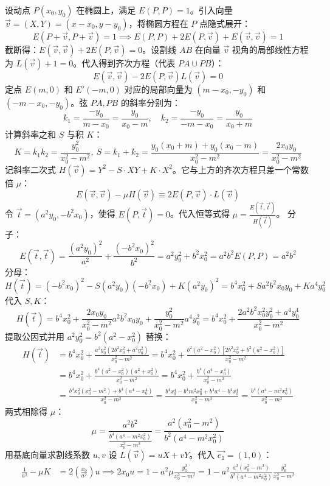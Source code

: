 \begin{solution}
设动点 $P(x_0, y_0)$ 在椭圆上，满足 $E(P,P) = 1$。引入向量 $\vec{v} = (X, Y) = (x-x_0, y-y_0)$，将椭圆方程在 $P$ 点隐式展开：
$$E(P+\vec{v}, P+\vec{v}) = 1 \implies E(P,P) + 2E(P, \vec{v}) + E(\vec{v}, \vec{v}) = 1$$
截断得：$E(\vec{v}, \vec{v}) + 2E(P, \vec{v}) = 0$。设割线 $AB$ 在向量 $\vec{v}$ 视角的局部线性方程为 $L(\vec{v}) + 1 = 0$。代入得到齐次方程（代表 $PA \cup PB$）：
$$E(\vec{v}, \vec{v}) - 2E(P, \vec{v})L(\vec{v}) = 0$$
定点 $E(m,0)$ 和 $E'(-m,0)$ 对应的局部向量为 $(m-x_0, -y_0)$ 和 $(-m-x_0, -y_0)$。弦 $PA, PB$ 的斜率分别为：$$k_1 = \frac{-y_0}{m-x_0} = \frac{y_0}{x_0-m}, \quad k_2 = \frac{-y_0}{-m-x_0} = \frac{y_0}{x_0+m}$$
计算斜率之和 $S$ 与积 $K$：
$$K = k_1 k_2 = \frac{y_0^2}{x_0^2-m^2},~S = k_1 + k_2 = \frac{y_0(x_0+m) + y_0(x_0-m)}{x_0^2-m^2} = \frac{2x_0 y_0}{x_0^2-m^2}$$
记斜率二次式 $H(\vec{v}) = Y^2 - S \cdot XY + K \cdot X^2$。它与上方的齐次方程只差一个常数倍 $\mu$：$$E(\vec{v}, \vec{v}) - \mu H(\vec{v}) \equiv 2E(P, \vec{v}) \cdot L(\vec{v})$$
令 $\vec{t} = (a^2 y_0, -b^2 x_0)$，使得 $E(P, \vec{t}) = 0$。代入恒等式得 $\mu = \frac{E(\vec{t}, \vec{t})}{H(\vec{t})}$。
分子：
$$E(\vec{t}, \vec{t}) = \frac{(a^2 y_0)^2}{a^2} + \frac{(-b^2 x_0)^2}{b^2} = a^2 y_0^2 + b^2 x_0^2 = a^2 b^2 E(P,P) = a^2 b^2$$
分母：$$H(\vec{t}) = (-b^2 x_0)^2 - S(a^2 y_0)(-b^2 x_0) + K(a^2 y_0)^2= b^4 x_0^2 + S a^2 b^2 x_0 y_0 + K a^4 y_0^2$$
代入 $S, K$：
$$H(\vec{t}) = b^4 x_0^2 + \frac{2x_0 y_0}{x_0^2-m^2} a^2 b^2 x_0 y_0 + \frac{y_0^2}{x_0^2-m^2} a^4 y_0^2 = b^4 x_0^2 + \frac{2a^2 b^2 x_0^2 y_0^2 + a^4 y_0^4}{x_0^2-m^2}$$
提取公因式并用 $a^2 y_0^2 = b^2(a^2-x_0^2)$ 替换：
\begin{align*}
H(\vec{t}) &= b^4 x_0^2 + \frac{a^2 y_0^2 (2b^2 x_0^2 + a^2 y_0^2)}{x_0^2-m^2} = b^4 x_0^2 + \frac{b^2(a^2-x_0^2)[2b^2 x_0^2 + b^2(a^2-x_0^2)]}{x_0^2-m^2}\\
&= b^4 x_0^2 + \frac{b^4(a^2-x_0^2)(a^2+x_0^2)}{x_0^2-m^2} = b^4 x_0^2 + \frac{b^4(a^4-x_0^4)}{x_0^2-m^2}\\
&=\frac{b^4 x_0^2(x_0^2-m^2) + b^4(a^4-x_0^4)}{x_0^2-m^2} = \frac{b^4 x_0^4 - b^4 m^2 x_0^2 + b^4 a^4 - b^4 x_0^4}{x_0^2-m^2} = \frac{b^4(a^4 - m^2 x_0^2)}{x_0^2-m^2}
\end{align*}
两式相除得 $\mu$：$$\mu = \frac{a^2 b^2}{\frac{b^4(a^4 - m^2 x_0^2)}{x_0^2-m^2}} = \frac{a^2(x_0^2 - m^2)}{b^2(a^4 - m^2 x_0^2)}$$
用基底向量求割线系数 $u, v$
设 $L(\vec{v}) = uX + vY$。代入 $\vec{e_1} = (1,0)$：
\begin{align*}
\frac{1}{a^2} - \mu K &= 2\left(\frac{x_0}{a^2}\right)u \implies 2x_0 u = 1 - a^2 \mu \frac{y_0^2}{x_0^2-m^2} = 1 - a^2 \frac{a^2(x_0^2-m^2)}{b^2(a^4-m^2 x_0^2)} \frac{y_0^2}{x_0^2-m^2}\\

\end{align*}
\end{solution}
